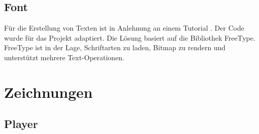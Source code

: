 \documentclass[doktyp=studarbeit]{TUBAFarbeiten}
\begin{document}
\FloatBarrier
\subsection{Font}
Für die Erstellung von Texten ist in Anlehnung an einem Tutorial \cite{learn-opengl}.
Der Code wurde für das Projekt adaptiert. 
Die Lösung basiert auf die Bibliothek FreeType. FreeType ist in der Lage,
Schriftarten zu laden, Bitmap zu rendern und unterstützt mehrere Text-Operationen.


\section{Zeichnungen}

\subsection{Player}
\end{document}
